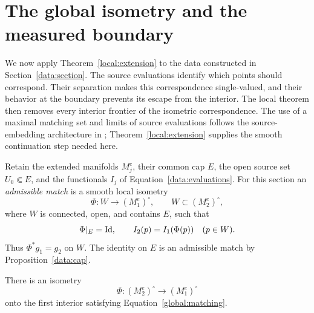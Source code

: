 \section{The global isometry and the measured boundary}
\label{global:section}

We now apply Theorem~\ref{local:extension} to the data constructed in
Section~\ref{data:section}. The source evaluations identify which
points should correspond. Their separation makes this correspondence
single-valued, and their behavior at the boundary prevents its escape
from the interior. The local theorem then removes every interior
frontier of the isometric correspondence.
The use of a maximal matching set and limits of source evaluations
follows the source-embedding architecture in
\citep[Section~6.1]{LLS20}; Theorem~\ref{local:extension} supplies the
smooth continuation step needed here.

Retain the extended manifolds $M_j^e$, their common cap $E$, the open
source set $U_0\Subset E$, and the functionals $I_j$ of
Equation~\eqref{data:evaluations}. For this section an \emph{admissible
match} is a smooth local isometry
\[
 \Phi:W\longrightarrow (M_1^e)^\circ,
 \qquad W\subset(M_2^e)^\circ,
\]
where $W$ is connected, open, and contains $E$, such that
\begin{equation}\label{global:matching}
 \Phi|_E=\mathrm{Id},\qquad I_2(p)=I_1(\Phi(p))\quad(p\in W).
\end{equation}
Thus $\Phi^*g_1=g_2$ on $W$. The identity on $E$ is an admissible
match by Proposition~\ref{data:cap}.

\begin{proposition}\label{global:frontier}
There is an isometry
\[
 \Phi:(M_2^e)^\circ\longrightarrow(M_1^e)^\circ
\]
onto the first interior satisfying Equation~\eqref{global:matching}.
\end{proposition}

